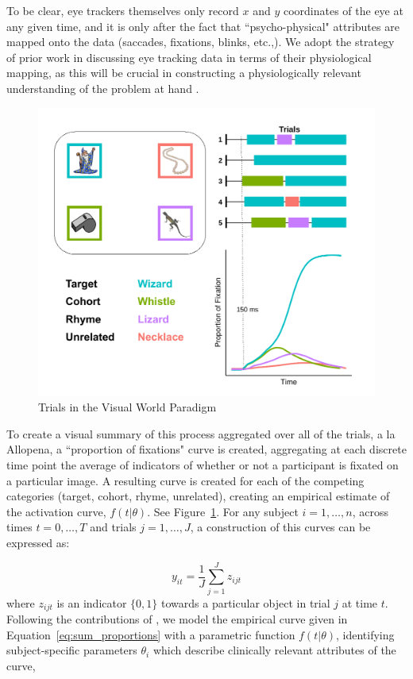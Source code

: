 \documentclass{article}
\begin{document}
To be clear, eye trackers themselves only record $x$ and $y$ coordinates of the eye at any given time, and it is only after the fact that ``psycho-physical" attributes are mapped onto the data (saccades, fixations, blinks, etc.,). We adopt the strategy of prior work in discussing eye tracking data in terms of their physiological mapping, as this will be crucial in constructing a physiologically relevant understanding of the problem at hand \citep{mcmurray2002look}.

\begin{figure}[H]
\centering
\includegraphics[scale=0.7]{collin_diagram_full.pdf}
\caption{Trials in the Visual World Paradigm}
\label{fig:collin_diagram_full}
\end{figure}


To create a visual summary of this process aggregated over all of the trials, a la Allopena, a ``proportion of fixations" curve is created, aggregating at each discrete time point the average of indicators of whether or not a participant is fixated on a particular image. A resulting curve is created for each of the competing categories (target, cohort, rhyme, unrelated), creating an empirical estimate of the activation curve, $f(t|\theta)$. See Figure~\ref{fig:collin_diagram_full}. For any subject $i = 1, \dots, n$, across times $t = 0, \dots, T$ and trials $j = 1, \dots, J$, a construction  of this curves can be expressed as:


\begin{equation}\label{eq:sum_proportions}
y_{it} = \frac1J \sum_{j=1}^J z_{ijt}
\end{equation}
where $z_{ijt}$ is an indicator $\{0, 1\}$  towards a particular object in trial $j$ at time $t$. Following the contributions of \citet{mcmurray2010individual}, we model the empirical curve given in Equation~\ref{eq:sum_proportions} with a parametric function $f(t|\theta)$, identifying subject-specific parameters $\theta_i$ which describe clinically relevant attributes of the curve, 
\end{document}
